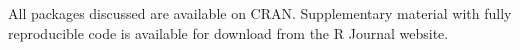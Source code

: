 All packages discussed are available on CRAN. Supplementary material with fully reproducible code is available for download from the R Journal website.


\address{%
Emi Tanaka\\
Australian National University\\%
\\
%
\url{https://journal.r-project.org}\\%
%
\href{mailto:r-journal@r-project.org}{\nolinkurl{r-journal@r-project.org}}%
}
